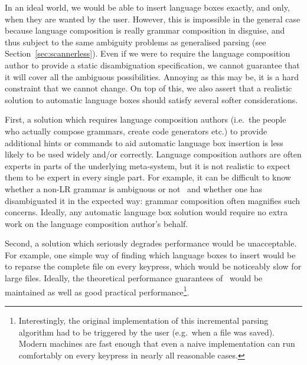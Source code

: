 \documentclass[sigplan,screen]{acmart}\settopmatter{printfolios=true,printccs=false,printacmref=false}
\begin{document}
In an ideal world, we would be able to insert language boxes exactly, and only,
when they are wanted by the user. However, this is impossible in the
general case because language composition is really grammar composition
in disguise, and thus subject to the same ambiguity problems as generalised
parsing (see Section~\ref{sec:scannerless}). Even if we were to require the
language composition author to provide a static disambiguation specification,
we cannot guarantee that it will cover all the ambiguous
possibilities. Annoying as this may be, it is a hard constraint that we cannot
change. On top of this, we also assert that a realistic solution to automatic
language boxes should satisfy several softer considerations.

First, a solution which requires language composition authors (i.e.~the people
who actually compose grammars, create code generators etc.) to provide additional
hints or commands to aid automatic language box insertion is less likely
to be used widely and/or correctly. Language composition authors are
often experts in parts of the underlying meta-system, but it is not realistic
to expect them to be expert in every single part. For example, it can be difficult to know whether
a non-LR grammar is ambiguous or not~\cite{vasudevan13detecting} and whether
one has disambiguated it in the expected way: grammar
composition often magnifies such concerns. Ideally, any automatic
language box solution would require no extra work on the language composition
author's behalf.

Second, a solution which seriously degrades performance would be unacceptable.
For example, one simple way of finding which language boxes to insert would
be to reparse the complete file on every keypress, which would be noticeably slow for large
files. Ideally, the theoretical performance guarantees
of~\citet{wagner98practicalalgorithms} would be maintained as well as good
practical performance\footnote{Interestingly, the original implementation of
this incremental parsing algorithm had to be triggered by the user (e.g.~when
a file was saved). Modern machines are fast enough that even a naive
implementation can run comfortably on every keypress in nearly all reasonable
cases.}.
\end{document}
